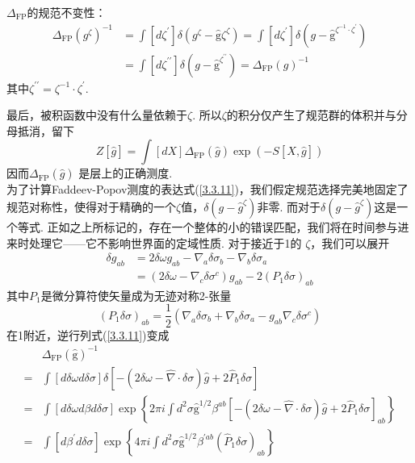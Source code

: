 \begin{remark}
$\Delta_{\mathrm{FP}}$的规范不变性：
$$
\begin{aligned}
\Delta_{\mathrm{FP}}\left(g^{\zeta}\right)^{-1} &=\int\left[d \zeta^{\prime}\right] \delta\left(g^{\zeta}-\hat{\mathrm{g}} \zeta^{\zeta}\right)=\int\left[d \zeta^{\prime}\right] \delta\left(g-\hat{\mathrm{g}}^{\zeta^{-1} \cdot \zeta^{\prime}}\right) \\
&=\int\left[d \zeta^{\prime \prime}\right] \delta\left(g-\hat{\mathrm{g}}^{\zeta^{\prime \prime}}\right)=\Delta_{\mathrm{FP}}(g)^{-1}
\end{aligned}
$$
其中$\zeta^{\prime \prime}=\zeta^{-1} \cdot \zeta^{\prime} $.
\end{remark}
最后，被积函数中没有什么量依赖于$\zeta$. 所以$\zeta$的积分仅产生了规范群的体积并与分母抵消，留下
\begin{equation}
Z[\hat{g}]=\int[d X] \Delta_{\mathrm{FP}}(\hat{g}) \exp (-S[X, \hat{g}])
\end{equation}
因而$\Delta_{\mathrm{FP}}(\hat{g})$ 是层上的正确测度.\\
为了计算Faddeev-Popov测度的表达式(\ref{3.3.11})，我们假定规范选择完美地固定了规范对称性，使得对于精确的一个$\zeta$值，$\delta(g-\hat{g} ^\zeta)$非零. 而对于$\delta(g-\hat{g}^ \zeta)$这是一个等式. 正如之上所标记的，存在一个整体的小的错误匹配，我们将在时间参与进来时处理它——它不影响世界面的定域性质. 对于接近于1的 $\zeta$，我们可以展开
\begin{equation}
\begin{aligned}
\delta g_{a b} &=2 \delta \omega g_{a b}-\nabla_{a} \delta \sigma_{b}-\nabla_{b} \delta \sigma_{a} \\
&=\left(2 \delta \omega-\nabla_{c} \delta \sigma^{c}\right) g_{a b}-2\left(P_{1} \delta \sigma\right)_{a b}
\end{aligned}
\end{equation}
其中$P_1$是微分算符使矢量成为无迹对称2-张量
\begin{equation}
\left(P_{1} \delta \sigma\right)_{a b}=\frac{1}{2}\left(\nabla_{a} \delta \sigma_{b}+\nabla_{b} \delta \sigma_{a}-g_{a b} \nabla_{c} \delta \sigma^{c}\right)
\end{equation}
在1附近，逆行列式(\ref{3.3.11})变成
\begin{equation}
\begin{aligned}
&\Delta_{\mathrm{FP}}(\hat{\mathrm{g}})^{-1} \\
=&\int[d \delta \omega d \delta \sigma] \delta\left[-(2 \delta \omega-\hat{\nabla} \cdot \delta \sigma) \hat{g}+2 \hat{P}_{1} \delta \sigma\right] \\
=&\int[d \delta \omega d \beta d \delta \sigma] \exp \left\{2 \pi i \int d^{2} \sigma \hat{\mathrm{g}}^{1 / 2} \beta^{a b}\left[-(2 \delta \omega-\hat{\nabla} \cdot \delta \sigma) \hat{g}+2 \hat{P}_{1} \delta \sigma\right]_{a b}\right\} \\
=&\int\left[d \beta^{\prime} d \delta \sigma\right] \exp \left\{4 \pi i \int d^{2} \sigma \hat{\mathrm{g}}^{1 / 2} \beta^{\prime a b}\left(\hat{P}_{1} \delta \sigma\right)_{a b}\right\}
\end{aligned}
\end{equation}
